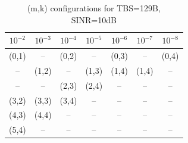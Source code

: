 \begin{table}[ht]
\centering
\caption{(m,k) configurations for TBS=129B, SINR=10dB}
\label{tab:conf_{129B_10dB}}
\begin{tabular}{ccccccc}
\hline
$10^{-2}$ & $10^{-3}$ & $10^{-4}$ & $10^{-5}$ & $10^{-6}$ & $10^{-7}$ & $10^{-8}$ \\ \hline
(0,1) & -- & (0,2) & -- & (0,3) & -- & (0,4) \\
-- & (1,2) & -- & (1,3) & (1,4) & (1,4) & -- \\
-- & -- & (2,3) & (2,4) & -- & -- & -- \\
(3,2) & (3,3) & (3,4) & -- & -- & -- & -- \\
(4,3) & (4,4) & -- & -- & -- & -- & -- \\
(5,4) & -- & -- & -- & -- & -- & -- \\
\hline
\end{tabular}
\end{table}